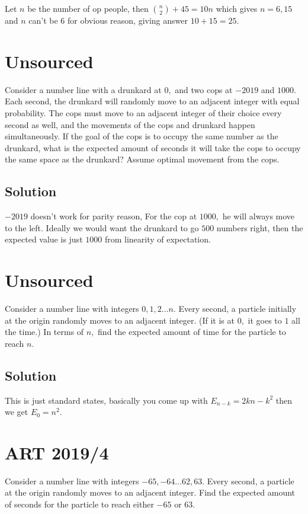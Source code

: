 \documentclass{article}
\begin{document}
Let $n$ be the number of op people, then $\binom n2+ 45 = 10n$ which gives $n=6,15$ and $n$ can't be $6$ for 
obvious reason, giving answer $10+15=25.$





\pagebreak\section{Unsourced}
Consider a number line with a drunkard at $0,$ and two cops at $-2019$ and $1000.$ Each second, the drunkard will randomly move to an adjacent integer with equal probability. The cops must move to an adjacent integer of their choice every second as well, and the movements of the cops and drunkard happen simultaneously. If the goal of the cops is to occupy the same number as the drunkard, what is the expected amount of seconds it will take the cops to occupy the same space as the drunkard? Assume optimal movement from the cops.
\subsection{Solution}
$-2019$ doesn't work for parity reason, For the cop at $1000,$ he will always move to the left. Ideally we would want the drunkard to go $500$ numbers right, then the expected value is just $1000$ from linearity of expectation.      


\pagebreak\section{Unsourced}
Consider a number line with integers $0,1,2\dots n.$ Every second, a particle initially at the origin randomly moves to an adjacent integer. (If it is at $0,$ it goes to $1$ all the time.) In terms of $n,$ find the expected amount of time for the particle to reach $n.$
\subsection{Solution}
This is just standard states, basically you come up with $E_{n-k}=2kn-k^2$ then we get $E_0 = n^2.$



\pagebreak\section{ART 2019/4} Consider a number line with integers $-65,-64\dots 62,63.$ Every second, a particle at the origin randomly moves to an adjacent integer. Find the expected amount of seconds for the particle to reach either $-65$ or $63.$
\end{document}
